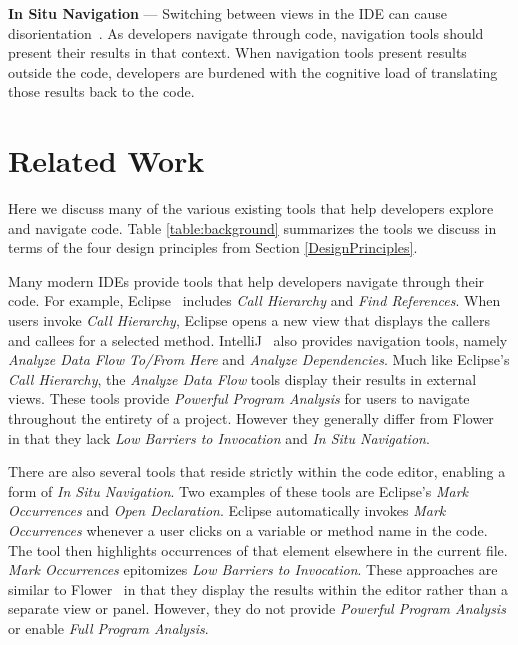 \documentclass[conference]{IEEEtran}
\newcommand{\toolName}{Flower}
\begin{document}
\vspace{1em} 
\noindent\textbf{In Situ Navigation}  ---
Switching between views in the IDE can cause disorientation~\cite{deAlwis2006disorient}. As developers navigate through code, navigation tools should present their results in that context. 
When navigation tools present results outside the code, developers are burdened with the cognitive load of translating those results back to the code.

\section{Related Work}
Here we discuss many of the various existing tools that help developers explore and navigate code. Table \ref{table:background} summarizes the tools we discuss in terms of the four design principles from Section \ref{DesignPrinciples}.

Many modern IDEs provide tools that help developers navigate through their code. 
For example, Eclipse~\cite{Eclipse} includes \emph{Call Hierarchy} and \emph{Find References}. 
When users invoke \emph{Call Hierarchy}, Eclipse opens a new view that displays the callers and callees for a selected method.  
IntelliJ~\cite{IntelliJ} also provides navigation tools, namely \emph{Analyze Data Flow To/From Here} and \emph{Analyze Dependencies}.
Much like Eclipse's \emph{Call Hierarchy}, the \emph{Analyze Data Flow} tools display their results in external views. 
These tools provide \textit{Powerful Program Analysis} for users to navigate throughout the entirety of a project. 
However they generally differ from \toolName~ in that they lack \textit{Low Barriers to Invocation} and \textit{In Situ Navigation}.

There are also several tools that reside strictly within the code editor, enabling a form of \textit{In Situ Navigation}.
Two examples of these tools are Eclipse's \emph{Mark Occurrences} and \emph{Open Declaration}. 
Eclipse automatically invokes \emph{Mark Occurrences} whenever a user clicks on a variable or method name in the code.
The tool then highlights occurrences of that element elsewhere in the current file.
\emph{Mark Occurrences} epitomizes \textit{Low Barriers to Invocation}.
These approaches are similar to \toolName~ in that they display the results within the editor rather than a separate view or panel.
However, they do not provide \textit{Powerful Program Analysis} or enable \textit{Full Program Analysis}.
\end{document}
